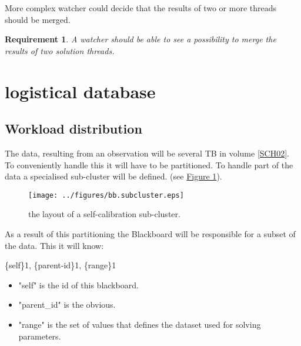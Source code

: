 \documentclass[]{lofar}
\newtheorem{requirement}{Requirement}[subsection]
\begin{document}
          More complex watcher could decide that the results of two or
          more threads should be merged.

          \begin{requirement}
            A watcher should be able to see a possibility to merge the
            results of two solution threads.
            \label{req:merge}
          \end{requirement}

  \section{logistical database}
  \label{sec:logistical-datamodel}
  \hypertarget{sec:logistical-datamodel}{}

    \subsection{Workload distribution}
    \label{subsec:workload-distribution-2}\hypertarget{subsec:workload-distribution-2}{}

      The data, resulting from an observation will be several TB in
      volume
      \hyperlink{LOFAR-ASTRON-MEM-035}{[SCH02]}. To
      conveniently handle this it will have to be partitioned. To
      handle part of the data a specialised sub-cluster will be
      defined. (see \hyperlink{fig:bb.subcluster}{Figure 1}).

      \begin{figure}
        \texttt{[image: ../figures/bb.subcluster.eps]}
        \hypertarget{fig:bb.subcluster}{}
        \caption{the layout of a self-calibration sub-cluster.\label{fig:bb.subcluster}}
      \end{figure}

      As a result of this partitioning the Blackboard will be
      responsible for a subset of the data. This it will know:

      \{self\}1, \{parent-id\}1, \{range\}1

      \begin{itemize}

        \item 

          "self" is the id of this blackboard.

        \item 

          "parent\_id" is the obvious.

        \item 

          "range" is the set of values that defines the dataset used
          for solving parameters.

      \end{itemize}
\end{document}
